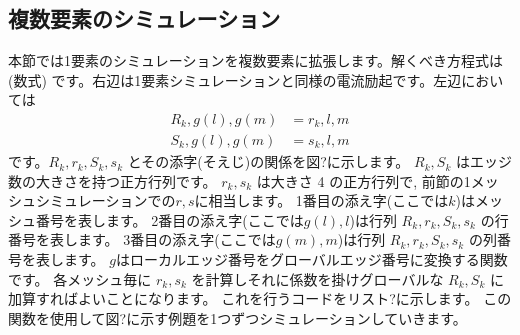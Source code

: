\subsection{複数要素のシミュレーション}

本節では1要素のシミュレーションを複数要素に拡張します。解くべき方程式は
(数式)
です。右辺は1要素シミュレーションと同様の電流励起です。左辺においては
\begin{align}
R_k,g(l),g(m) &= r_k,l,m\\
S_k,g(l),g(m) &= s_k,l,m
\end{align}
です。$R_k, r_k, S_k, s_k$ とその添字(そえじ)の関係を図?に示します。
$R_k, S_k$ はエッジ数の大きさを持つ正方行列です。
$r_k, s_k$ は大きさ 4 の正方行列で,
前節の1メッシュシミュレーションでの$r, s$に相当します。
1番目の添え字(ここでは$k$)はメッシュ番号を表します。
2番目の添え字(ここでは$g(l), l$)は行列
$R_k, r_k, S_k, s_k$ の行番号を表します。
3番目の添え字(ここでは$g(m), m$)は行列
$R_k, r_k, S_k, s_k$ の列番号を表します。
$g$はローカルエッジ番号をグローバルエッジ番号に変換する関数です。
各メッシュ毎に $r_k, s_k$ を計算しそれに係数を掛けグローバルな
$R_k, S_k$ に加算すればよいことになります。
これを行うコードをリスト?に示します。
この関数を使用して図?に示す例題を1つずつシミュレーションしていきます。
